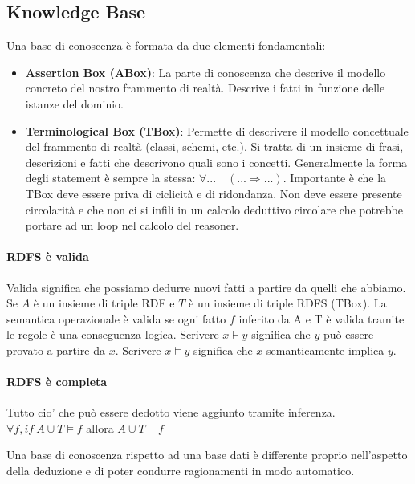 \subsection{Knowledge Base}
Una base di conoscenza è formata da due elementi fondamentali:
\begin{itemize}
	\item \textbf{Assertion Box (ABox)}: La parte di conoscenza che descrive il modello concreto del nostro frammento di realtà. Descrive i fatti in funzione delle istanze del dominio.
	\item \textbf{Terminological Box (TBox)}: Permette di descrivere il modello concettuale del frammento di realtà (classi, schemi, etc.). Si tratta di un insieme di frasi, descrizioni e fatti che descrivono quali sono i concetti. Generalmente la forma degli statement è sempre la stessa: $\forall...\quad(...\Rightarrow...)$. Importante è che la TBox deve essere priva di ciclicità e di ridondanza. Non deve essere presente circolarità e che non ci si infili in un  calcolo deduttivo circolare che potrebbe portare ad un loop nel calcolo del reasoner.
\end{itemize}
\paragraph{RDFS è  valida}
Valida significa che possiamo dedurre nuovi fatti a partire da quelli che abbiamo. Se $A$ è un insieme di triple RDF e $T$ è un insieme di triple RDFS (TBox). La semantica operazionale è valida se ogni fatto $f$ inferito da A e T è valida tramite le regole è una conseguenza logica.
Scrivere $x \vdash y$ significa che $y$ può essere provato a partire da $x$. Scrivere  $x\models y$ significa che $x$ semanticamente implica $y$.

\paragraph{RDFS è completa}
Tutto cio' che può essere dedotto viene aggiunto tramite inferenza.
$\forall f, if\ A \cup T \models f$ allora $A \cup T \vdash f$

\noindent Una base di conoscenza rispetto ad una base dati è differente proprio nell'aspetto della deduzione e di poter condurre ragionamenti in modo automatico.
